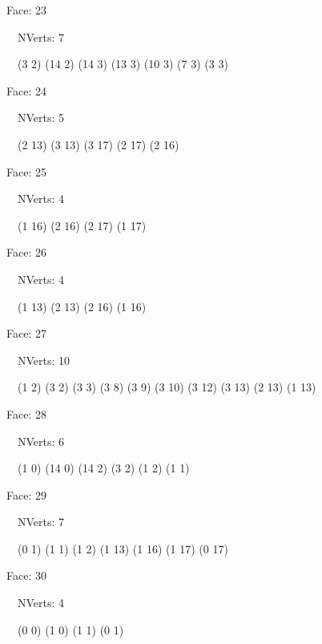 \documentclass{article}
\begin{document}
{\footnotesize 

Face: 23

\   \    NVerts: 7

 \   \   (3 2) (14 2) (14 3) (13 3) (10 3) (7 3) (3 3)}

{\footnotesize 

Face: 24

\   \    NVerts: 5

 \   \   (2 13) (3 13) (3 17) (2 17) (2 16)}

{\footnotesize 

Face: 25

\   \    NVerts: 4

 \   \   (1 16) (2 16) (2 17) (1 17)}

{\footnotesize 

Face: 26

\   \    NVerts: 4

 \   \   (1 13) (2 13) (2 16) (1 16)}

{\footnotesize 

Face: 27

\   \    NVerts: 10

 \   \   (1 2) (3 2) (3 3) (3 8) (3 9) (3 10) (3 12) (3 13) (2 13) (1 13)}

{\footnotesize 

Face: 28

\   \    NVerts: 6

 \   \   (1 0) (14 0) (14 2) (3 2) (1 2) (1 1)}

{\footnotesize 

Face: 29

\   \    NVerts: 7

 \   \   (0 1) (1 1) (1 2) (1 13) (1 16) (1 17) (0 17)}

{\footnotesize 

Face: 30

\   \    NVerts: 4

 \   \   (0 0) (1 0) (1 1) (0 1)}


 \newpage
\end{document}
